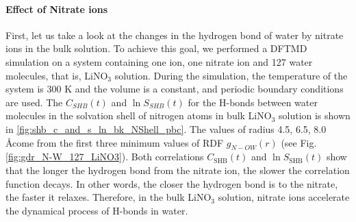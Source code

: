 \paragraph{Effect of Nitrate ions}
First, let us take a look at the changes in the hydrogen bond of water by nitrate ions in the bulk solution. 
To achieve this goal, we performed a DFTMD simulation on a system containing one \Li ion, one nitrate ion 
and 127 water molecules, that is, LiNO$_3$ solution. During the simulation, the temperature of the system is 
300 K and the volume is a constant, and periodic boundary conditions are used.
The $C_{SHB}(t)$ and $\ln{S_{SHB}(t)}$ for the H-bonds between water molecules in the solvation shell of nitrogen atoms in bulk LiNO$_3$ solution is shown in 
\ref{fig:shb_c_and_s_ln_bk_NShell_pbc}. The values of radius 4.5, 6.5, 8.0 \AA come from the first three minimum values of RDF $g_{N-OW}(r)$ 
(see Fig.\thinspace\ref{fig:gdr_N-W_127_LiNO3}). 
Both correlations $C_{\text{SHB}}(t)$ and $\ln{S_{\text{SHB}}(t)}$ show that the longer the hydrogen bond from the nitrate ion, the slower the correlation function decays. 
In other words, the closer the hydrogen bond is to the nitrate, the faster it relaxes. Therefore, in the bulk LiNO$_3$ solution, nitrate ions accelerate the dynamical 
process of H-bonds in water.
%

